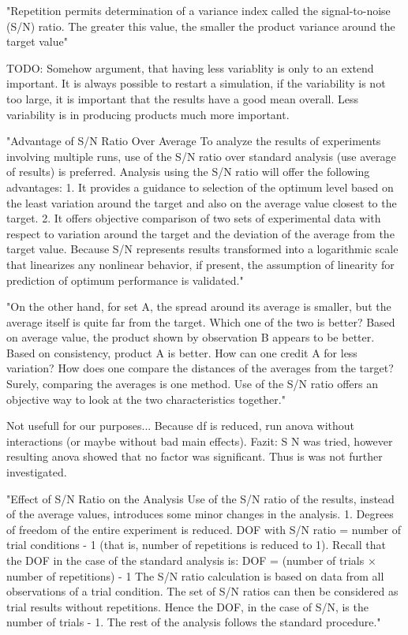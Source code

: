 "Repetition permits determination of a variance index called the signal-to-noise (S/N) ratio. The greater this value, the smaller the product variance around the target value"\cite{roy_primer_1990}

TODO: Somehow argument, that having less variablity is only to an extend important. It is always possible to restart a simulation, if the variability is not too large, it is important that the results have a good mean overall. Less variability is in producing products much more important.


"Advantage of S/N Ratio Over Average To analyze the results of experiments involving multiple runs, use of the S/N ratio over standard analysis (use average of results) is preferred. Analysis using the S/N ratio will offer the following advantages: 1. It provides a guidance to selection of the optimum level based on the least variation around the target and also on the average value closest to the target. 2. It offers objective comparison of two sets of experimental data with respect to variation around the target and the deviation of the average from the target value. Because S/N represents results transformed into a logarithmic scale that linearizes any nonlinear behavior, if present, the assumption of linearity for prediction of optimum performance is validated."\cite{roy_primer_1990}


"On the other hand, for set A, the spread around its average is smaller, but the average itself is quite far from the target. Which one of the two is better? Based on average value, the product shown by observation B appears to be better. Based on consistency, product A is better. How can one credit A for less variation? How does one compare the distances of the averages from the target? Surely, comparing the averages is one method. Use of the S/N ratio offers an objective way to look at the two characteristics together."\cite{roy_primer_1990}



Not usefull for our purposes... Because df is reduced, run anova without interactions (or maybe without bad main effects). Fazit: S N was tried, however resulting anova showed that no factor was significant. Thus is was not further investigated.

"Effect of S/N Ratio on the Analysis Use of the S/N ratio of the results, instead of the average values, introduces some minor changes in the analysis. 
1. Degrees of freedom of the entire experiment is reduced. DOF with S/N ratio = number of trial conditions - 1 (that is, number of repetitions is reduced to 1). 
Recall that the DOF in the case of the standard analysis is: DOF = (number of trials × number of repetitions) - 1 The S/N ratio calculation is based on data from all observations of a trial condition. 
The set of S/N ratios can then be considered as trial results without repetitions.
Hence the DOF, in the case of S/N, is the number of trials - 1. 
The rest of the analysis follows the standard procedure."\cite{roy_primer_1990}


